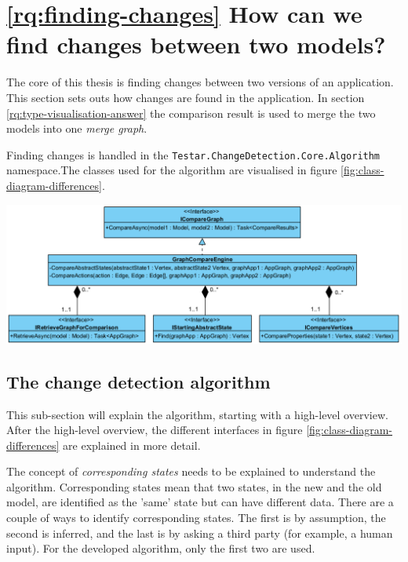 \section{\ref{rq:finding-changes} How can we find changes between two models?} \label{sec:finding-changes}

The core of this thesis is finding changes between two versions of an application. This section sets outs how changes are found in the application. In section \ref{rq:type-visualisation-answer} the comparison result is used to merge the two models into one \textit{merge graph}.

Finding changes is handled in the \verb|Testar.ChangeDetection.Core.Algorithm| namespace.The classes used for the algorithm are visualised in figure \ref{fig:class-diagram-differences}. 

\begingroup
\captionsetup{type=figure}
\includegraphics[scale=0.65]{images/4-UML-Differences.png}
\label{fig:class-diagram-differences}
\endgroup

\subsection{The change detection algorithm} \label{sec:change-detection-algorithm}
This sub-section will explain the algorithm, starting with a high-level overview. After the high-level overview, the different interfaces in figure \ref{fig:class-diagram-differences} are explained in more detail.

The concept of \textit{corresponding states} needs to be explained to understand the algorithm. Corresponding states mean that two states, in the new and the old model, are identified as the 'same' state but can have different data. There are a couple of ways to identify corresponding states. The first is by assumption, the second is inferred, and the last is by asking a third party (for example, a human input). For the developed algorithm, only the first two are used. 

